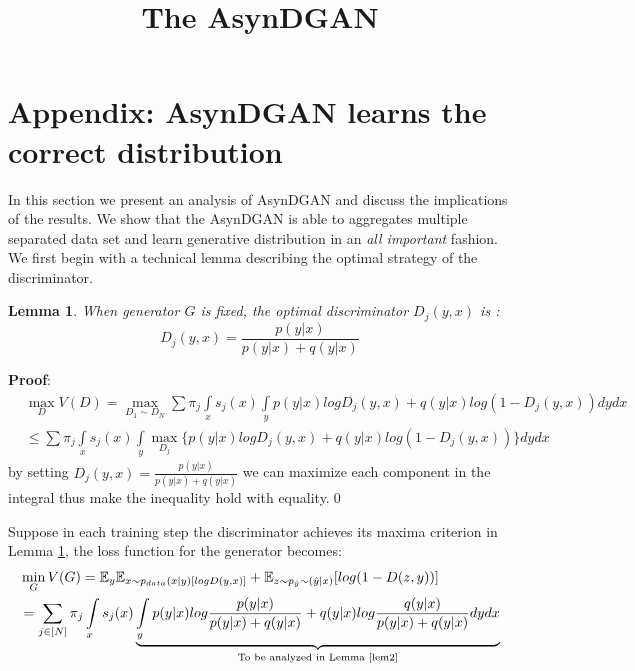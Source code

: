 \documentclass{article}
\title{The AsynDGAN}
\newtheorem{lemma}{Lemma}
\theoremstyle{definition}
\begin{document}
	
\clearpage
\onecolumn
	\section{Appendix: AsynDGAN learns the correct distribution}
	In this section we present an analysis of AsynDGAN and discuss the implications of the results. We show that the AsynDGAN is able to aggregates multiple separated data set and learn generative distribution in an \emph{all important} fashion.
	We first begin with a technical lemma describing the optimal strategy of the discriminator.
	\begin{lemma}\label{lem1}
		When generator $G$ is fixed,  the optimal discriminator $D_j(y,x)$ is :\\
		\begin{equation}
		D_j(y,x)=\frac{p(y|x)}{p(y|x)+q(y|x)}
		\end{equation}
	\end{lemma}
	\textbf{Proof}:\\
	\begin{equation*}
	\begin{aligned}
	&\max\limits_{D}V(D)=\max\limits_{D_1\sim D_N}\sum \pi_j\int\limits_{x} s_j(x)\int\limits_{y} p(y|x)log D_j(y,x)+q(y|x)log(1-D_j(y,x)) dydx\\
	&\leq \sum \pi_j\int\limits_{x} s_j(x)\int\limits_{y} \max\limits_{D_j} \{p(y|x)log D_j(y,x)+q(y|x)log(1-D_j(y,x)) \}dydx
	\end{aligned}
	\end{equation*}
	by setting $D_j(y,x)=\frac{p(y|x)}{p(y|x)+q(y|x)}$ we can maximize each component in the integral thus make the inequality hold with equality.\qed
	
	Suppose in each training step the discriminator achieves its maxima criterion in Lemma \ref{lem1}, the loss function for the generator becomes:\\
	\begin{equation*}
	\begin{aligned}
	&\min\limits_{G}V(G)= \mathbb{E}_{y}\mathbb{E}_{x\sim p_{data}(x|y) [logD(y,x)]} +\mathbb{E}_{z\sim p_{\hat{y}}\sim(\hat{y}|x)} [log(1-D(z,y))]\\
	&=\sum_{j\in[N]} \pi_j\int\limits_{x} s_j(x) \underbrace{\int\limits_{y} p(y|x)log\frac{p(y|x)}{p(y|x)+q(y|x)}+q(y|x)log\frac{q(y|x)}{p(y|x)+q(y|x)} dydx}_{\text {To be analyzed in Lemma \ref{lem2}}}
	\end{aligned}
	\end{equation*}
	
\end{document}
